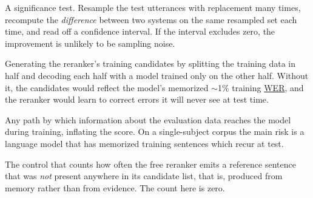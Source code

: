\documentclass{article}
\DeclareRobustCommand{\glref}[2]{\hyperlink{gl:#1}{\textcolor{glosslink}{#2}}}
\newcommand{\glentry}[2]{\item[\hypertarget{gl:#1}{#2}]}
\newenvironment{glosslist}
  {\begin{description}[style=nextline,leftmargin=2.1em,labelindent=0pt,
      itemsep=5pt,parsep=0pt,topsep=2pt,font=\normalfont\bfseries]}
  {\end{description}}
\DeclareRobustCommand{\wer}{\glref{wer}{WER}}
\begin{document}
\begin{glosslist}
\glentry{bootstrap}{Paired bootstrap}
A significance test. Resample the test utterances with replacement many times, recompute the
\emph{difference} between two systems on the same resampled set each time, and read off a confidence
interval. If the interval excludes zero, the improvement is unlikely to be sampling noise.

\glentry{crossdecode}{Cross-decoding (two-fold)}
Generating the reranker's training candidates by splitting the training data in half and decoding each
half with a model trained only on the other half. Without it, the candidates would reflect the model's
memorized $\sim$1\% training \wer{}, and the reranker would learn to correct errors it will never see
at test time.

\glentry{leakage}{Leakage}
Any path by which information about the evaluation data reaches the model during training, inflating the
score. On a single-subject corpus the main risk is a language model that has memorized training
sentences which recur at test.

\glentry{verbatim}{Verbatim-recall audit}
The control that counts how often the free reranker emits a reference sentence that was \emph{not}
present anywhere in its candidate list, that is, produced from memory rather than from evidence. The
count here is zero.

\end{glosslist}
\end{document}
